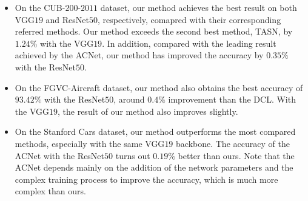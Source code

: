 \documentclass{article}
\begin{document}
\begin{itemize}
    \item On the CUB-$200$-$2011$ dataset, our method achieves the best result on both VGG$19$ and ResNet$50$, respectively, comapred with their corresponding referred methods. Our method exceeds the second best method, TASN, by $1.24\%$ with the VGG$19$. In addition, compared with the leading result achieved by the ACNet, our method has improved the accuracy by $0.35\%$ with the ResNet$50$. 
    \vspace{-3mm}
    
    \item On the FGVC-Aircraft dataset, our method also obtains the best accuracy of $93.42\%$ with the ResNet$50$, around $0.4\%$ improvement than the DCL. With the VGG$19$, the result of our method also improves slightly.
    \vspace{-3mm}
    
    \item On the Stanford Cars dataset, our  method outperforms the most compared methods, especially with the same VGG$19$ backbone. The accuracy of the ACNet with the ResNet$50$ turns out $0.19\%$ better than ours. Note that the ACNet depends mainly on the addition of the network parameters and the complex training process to improve the accuracy, which is much more complex than ours.
\end{itemize}


\begin{table}[!t]

    \centering
    \vspace{-2.5mm}
    \caption{Ablation study of our method on classification accuracies (\%). Key modules of the proposed method, including the channel attention, the spatial attention, and the Grad-CAM are compared. 
``$\checkmark$'' represents the  module contained, otherwise ``$\times$''. The best result is in~\textbf{bold}. }
    \label{ablation}
    
\end{table}
\end{document}
